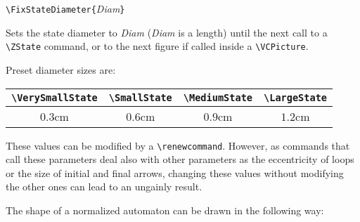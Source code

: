 \documentclass[11pt,twoside]{article}
\newlength{\ColoText}%
\newlength{\ColoFigu}%
\newlength{\parindenttemp} %
\newcommand{\noi}{\noindent}
\newlength{\jsIndent}%
\begin{document}
\noi 
\hspace*{-\jsIndent}
\begin{minipage}[t]{\ColoText}
        \par\vspace*{0mm}%
        \footnotesize
\verb+\FixStateDiameter{+\textsl{Diam}\verb+}+
   \end{minipage}%
\hspace*{1.2em}%
\begin{minipage}[t]{\ColoFigu}%
\par\vspace*{0mm}%
Sets the state diameter to \textsl{Diam} (\textsl{Diam} is 
a length) until the next call to a \verb+\ZState+ command, or to the 
next figure if called inside a \verb+\VCPicture+.
\end{minipage}%

\smallskip
Preset diameter sizes are:
\begin{center}
\begin{tabular}{|c|c|c|c|}
\verb+\VerySmallState+ & \verb+\SmallState+ & \verb+\MediumState+ & 
\verb+\LargeState+\\ 
\hline
$0.3$cm & $0.6$cm & $0.9$cm &  $1.2$cm\\
\hline
\end{tabular}
\end{center}

These values can be modified by a \verb+\renewcommand+. However, as
commands that call these parameters deal also with other parameters
as the eccentricity of loops or the size of initial and final arrows,
changing these values without modifying the other ones can lead to
an ungainly result.

The shape of a normalized automaton can be drawn in the following way:
\end{document}
